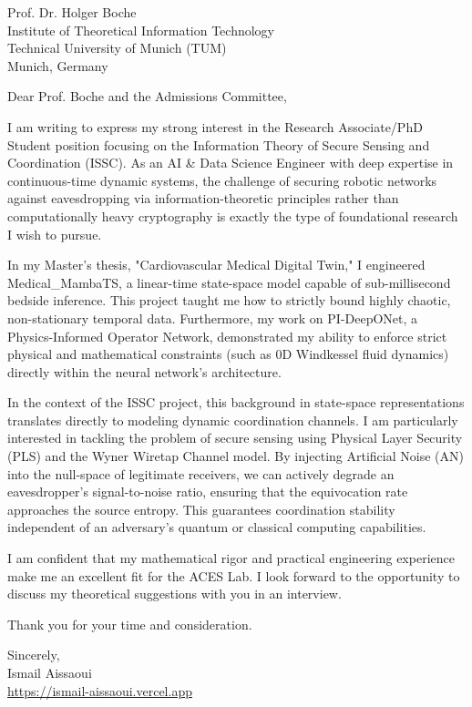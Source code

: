 \documentclass[11pt, a4paper]{letter}
\begin{document}
\begin{letter}{Prof. Dr. Holger Boche \\ Institute of Theoretical Information Technology \\ Technical University of Munich (TUM) \\ Munich, Germany}

\opening{Dear Prof. Boche and the Admissions Committee,}

I am writing to express my strong interest in the Research Associate/PhD Student position focusing on the Information Theory of Secure Sensing and Coordination (ISSC). As an AI \& Data Science Engineer with deep expertise in continuous-time dynamic systems, the challenge of securing robotic networks against eavesdropping via information-theoretic principles rather than computationally heavy cryptography is exactly the type of foundational research I wish to pursue.

In my Master's thesis, "Cardiovascular Medical Digital Twin," I engineered Medical\_MambaTS, a linear-time state-space model capable of sub-millisecond bedside inference. This project taught me how to strictly bound highly chaotic, non-stationary temporal data. Furthermore, my work on PI-DeepONet, a Physics-Informed Operator Network, demonstrated my ability to enforce strict physical and mathematical constraints (such as 0D Windkessel fluid dynamics) directly within the neural network's architecture. 

In the context of the ISSC project, this background in state-space representations translates directly to modeling dynamic coordination channels. I am particularly interested in tackling the problem of secure sensing using Physical Layer Security (PLS) and the Wyner Wiretap Channel model. By injecting Artificial Noise (AN) into the null-space of legitimate receivers, we can actively degrade an eavesdropper's signal-to-noise ratio, ensuring that the equivocation rate approaches the source entropy. This guarantees coordination stability independent of an adversary's quantum or classical computing capabilities.

I am confident that my mathematical rigor and practical engineering experience make me an excellent fit for the ACES Lab. I look forward to the opportunity to discuss my theoretical suggestions with you in an interview.

Thank you for your time and consideration.

\closing{Sincerely, \\ Ismail Aissaoui \\ \href{https://ismail-aissaoui.vercel.app}{https://ismail-aissaoui.vercel.app}}

\end{letter}
\end{document}
